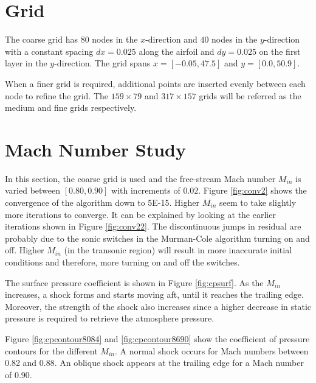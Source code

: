 \documentclass[letterpaper,12pt,]{article}
\begin{document}



\section*{Grid}

The coarse grid has $80$ nodes in the $x$-direction and $40$ nodes in the $y$-direction with a constant spacing $dx = 0.025$ along the airfoil and $dy=0.025$ on the first layer in the $y$-direction.
The grid spans $x=[-0.05, 47.5]$ and $y=[0.0, 50.9]$.

When a finer grid is required, additional points are inserted evenly between each node to refine the grid.
The $159 \times 79$ and $317 \times 157$ grids will be referred as the medium and fine grids respectively.

\section*{Mach Number Study}

In this section, the coarse grid is used and the free-stream Mach number $M_{in}$ is varied between $[0.80,0.90]$ with increments of $0.02$.
Figure \ref{fig:conv2} shows the convergence of the algorithm down to 5\textsc{E-}15.
Higher $M_{in}$ seem to take slightly more iterations to converge.
It can be explained by looking at the earlier iterations shown in Figure \ref{fig:conv22}.
The discontinuous jumps in residual are probably due to the sonic switches in the Murman-Cole algorithm turning on and off.
Higher $M_{in}$ (in the transonic region) will result in more inaccurate initial conditions and therefore, more turning on and off the switches.

The surface pressure coefficient is shown in Figure \ref{fig:cpsurf}.
As the $M_{in}$ increases, a shock forms and starts moving aft, until it reaches the trailing edge.
Moreover, the strength of the shock also increases since a higher decrease in static pressure is required to retrieve the atmosphere pressure.

Figure \ref{fig:cpcontour8084} and \ref{fig:cpcontour8690} show the coefficient of pressure contours for the different $M_{in}$.
A normal shock occurs for Mach numbers between 0.82 and 0.88.
An oblique shock appears at the trailing edge for a Mach number of 0.90.
\end{document}

